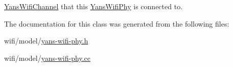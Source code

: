 \hyperlink{classns3_1_1YansWifiChannel}{Yans\+Wifi\+Channel} that this \hyperlink{classns3_1_1YansWifiPhy}{Yans\+Wifi\+Phy} is connected to. 



The documentation for this class was generated from the following files\+:\begin{DoxyCompactItemize}
\item 
wifi/model/\hyperlink{yans-wifi-phy_8h}{yans-\/wifi-\/phy.\+h}\item 
wifi/model/\hyperlink{yans-wifi-phy_8cc}{yans-\/wifi-\/phy.\+cc}\end{DoxyCompactItemize}
